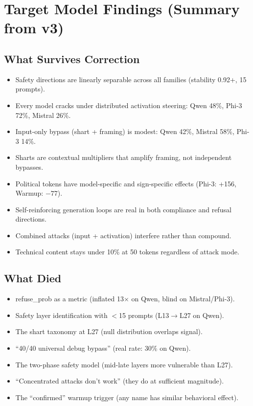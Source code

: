 \documentclass[11pt,a4paper]{article}
\begin{document}
\section{Target Model Findings (Summary from v3)}

\subsection{What Survives Correction}

\begin{itemize}[nosep]
\item Safety directions are linearly separable across all families (stability 0.92+, 15 prompts).
\item Every model cracks under distributed activation steering: Qwen 48\%, Phi-3 72\%, Mistral 26\%.
\item Input-only bypass (shart + framing) is modest: Qwen 42\%, Mistral 58\%, Phi-3 14\%.
\item Sharts are contextual multipliers that amplify framing, not independent bypasses.
\item Political tokens have model-specific and sign-specific effects (Phi-3: +156, Warmup: $-77$).
\item Self-reinforcing generation loops are real in both compliance and refusal directions.
\item Combined attacks (input + activation) interfere rather than compound.
\item Technical content stays under 10\% at 50 tokens regardless of attack mode.
\end{itemize}

\subsection{What Died}
\begin{itemize}[nosep]
\item refuse\_prob as a metric (inflated 13$\times$ on Qwen, blind on Mistral/Phi-3).
\item Safety layer identification with $<$15 prompts (L13$\to$L27 on Qwen).
\item The shart taxonomy at L27 (null distribution overlaps signal).
\item ``40/40 universal debug bypass'' (real rate: 30\% on Qwen).
\item The two-phase safety model (mid-late layers more vulnerable than L27).
\item ``Concentrated attacks don't work'' (they do at sufficient magnitude).
\item The ``confirmed'' warmup trigger (any name has similar behavioral effect).
\end{itemize}
\end{document}
